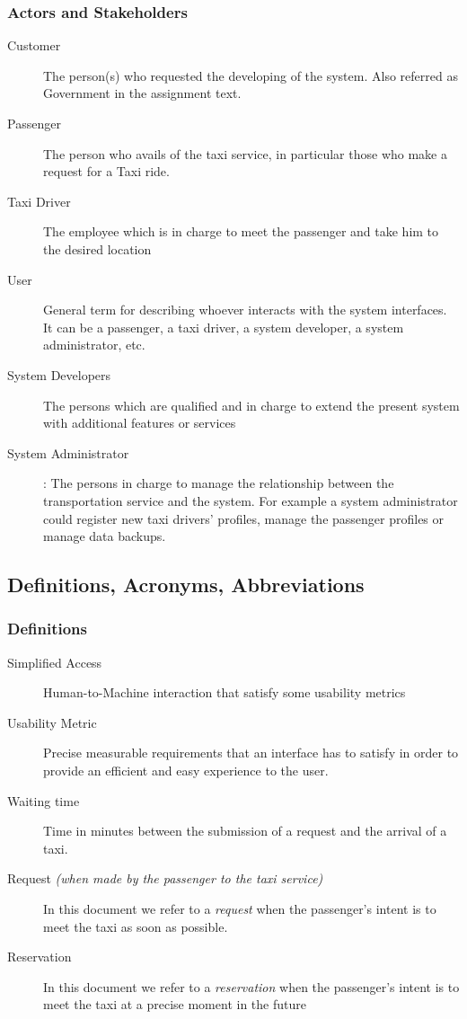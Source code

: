 \documentclass[11pt, a4paper,titlepage]{article}
\begin{document}
\subsubsection{Actors and Stakeholders}
\begin{description}
	\item[Customer] \label{itm:Actor_Customer} The person(s) who requested the developing of the system. Also referred as Government in the assignment text.
	\item[Passenger] \label{itm:Actor_Passenger} The person who avails of the taxi service, in particular those who make a request for a Taxi ride.
	\item[Taxi Driver] \label{itm:Actor_TaxiDriver} The employee which is in charge to meet the passenger and take him to the desired location
	\item[User]\label{itm:Actor_User} General term for describing whoever interacts with the system interfaces. It can be a passenger, a taxi driver, a system developer, a system administrator, etc.
	\item[System Developers] \label{itm:Actor_SysDevs} The persons which are qualified and in charge to extend the present system with additional features or services
	\item[System Administrator] \label{itm:Actor_SysAdmin}: The persons in charge to manage the relationship between the transportation service and the system. For example a system administrator could register new taxi drivers’ profiles, manage the passenger profiles or manage data backups.
\end{description}

\subsection{Definitions, Acronyms, Abbreviations}
\subsubsection{Definitions}
	\begin{description}
		\item[Simplified Access] \label{itm:Desc_SimplifiedAccess} Human-to-Machine interaction that satisfy some usability metrics
		\item[Usability Metric] \label{itm:Desc_UsabilityMetric} Precise measurable requirements that an interface has to satisfy in order to provide an efficient and easy experience to the user.
		\item[Waiting time] \label{itm:Desc_WaitingTime} Time in minutes between the submission of a request and the arrival of a taxi.
		\item[Request \textit{(when made by the passenger to the taxi service)}] \label{Itm:Desc_Request} In this document we refer to a \textit{request} when the passenger's intent is to meet the taxi as soon as possible.
		\item[Reservation] \label{Itm:Desc_Reservation} In this document we refer to a \textit{reservation} when the passenger's intent is to meet the taxi at a precise moment in the future
	\end{description}
\end{document}
